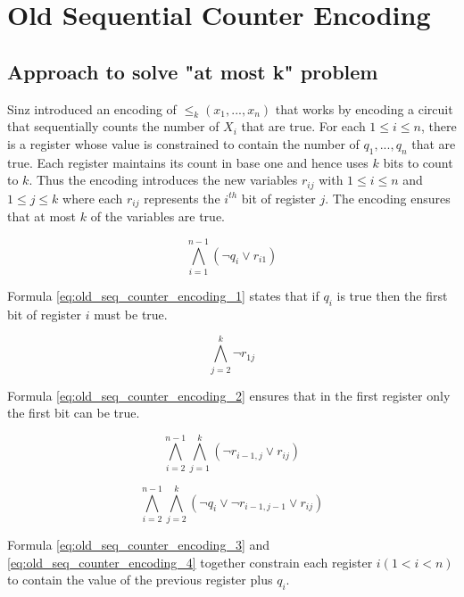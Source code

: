 \section{Old Sequential Counter Encoding}
\subsection{Approach to solve "at most k" problem}
Sinz\cite{carstensinz} introduced an encoding of $\le _k(x_1,...,x_n)$
that works by encoding a circuit that sequentially counts the number of $X_i$ that are true.
For each $1 \le i \le n$, there is a register whose value is constrained to contain the number of
$q_1, ..., q_n$ that are true. Each register maintains its count in base one and hence
uses $k$ bits to count to $k$. Thus the encoding introduces the new variables
$r_{ij}$ with $1 \le i \le n$ and $1 \le j \le k$ where each $r_{ij}$ represents the $i^{th}$ bit of register $j$.
The encoding ensures that at most $k$ of the variables are true.

\begin{equation}
    \label{eq:old_seq_counter_encoding_1}
    \bigwedge_{i=1}^{n-1} \left( \neg q_i \vee r_{i1} \right)
\end{equation}

Formula \ref{eq:old_seq_counter_encoding_1} states that if $q_i$ is true then the first bit of register $i$ must be true.

\begin{equation}
    \label{eq:old_seq_counter_encoding_2}
    \bigwedge_{j=2}^{k} \neg r_{1j}
\end{equation}

Formula \ref{eq:old_seq_counter_encoding_2} ensures that in the first register only the first bit can be true.

\begin{equation}
    \label{eq:old_seq_counter_encoding_3}
    \bigwedge_{i=2}^{n-1} \bigwedge_{j=1}^{k} \left(\neg r_{i-1,j} \vee r_{ij} \right)
\end{equation}

\begin{equation}
    \label{eq:old_seq_counter_encoding_4}
    \bigwedge_{i=2}^{n-1} \bigwedge_{j=2}^{k} \left(\neg q_i \vee \neg r_{i-1,j-1} \vee r_{ij} \right)
\end{equation}

Formula \ref{eq:old_seq_counter_encoding_3} and \ref{eq:old_seq_counter_encoding_4}
together constrain each register $i (1 < i < n)$ to contain the value of
the previous register plus $q_i$.

